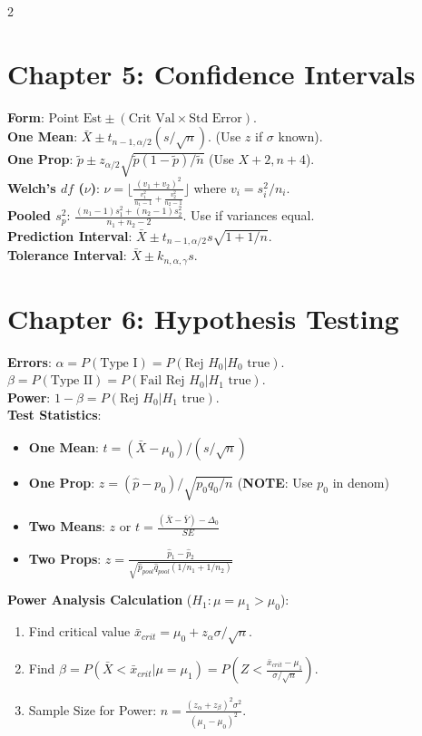 \documentclass[10pt]{article}
\begin{document}
\begin{multicols}{2}
\section*{Chapter 5: Confidence Intervals}
\textbf{Form}: $\text{Point Est} \pm (\text{Crit Val} \times \text{Std Error})$. \\
\textbf{One Mean}: $\bar{X} \pm t_{n-1, \alpha/2} (s/\sqrt{n})$. (Use $z$ if $\sigma$ known). \\
\textbf{One Prop}: $\tilde{p} \pm z_{\alpha/2} \sqrt{\tilde{p}(1-\tilde{p})/\tilde{n}}$ (Use $X+2, n+4$). \\
\textbf{Welch's $df$ ($\nu$)}: $\nu = \lfloor \frac{(v_1+v_2)^2}{\frac{v_1^2}{n_1-1} + \frac{v_2^2}{n_2-1}} \rfloor$ where $v_i = s_i^2/n_i$. \\
\textbf{Pooled $s_p^2$}: $\frac{(n_1-1)s_1^2 + (n_2-1)s_2^2}{n_1+n_2-2}$. Use if variances equal. \\
\textbf{Prediction Interval}: $\bar{X} \pm t_{n-1, \alpha/2} s \sqrt{1 + 1/n}$. \\
\textbf{Tolerance Interval}: $\bar{X} \pm k_{n, \alpha, \gamma} s$.

\columnbreak

\section*{Chapter 6: Hypothesis Testing}
\textbf{Errors}: $\alpha = P(\text{Type I}) = P(\text{Rej } H_0 | H_0 \text{ true})$. \\
$\beta = P(\text{Type II}) = P(\text{Fail Rej } H_0 | H_1 \text{ true})$. \\
\textbf{Power}: $1-\beta = P(\text{Rej } H_0 | H_1 \text{ true})$. \\
\textbf{Test Statistics}:
\begin{itemize}
    \item \textbf{One Mean}: $t = (\bar{X}-\mu_0)/(s/\sqrt{n})$
    \item \textbf{One Prop}: $z = (\hat{p}-p_0)/\sqrt{p_0 q_0/n}$ (\textbf{NOTE}: Use $p_0$ in denom)
    \item \textbf{Two Means}: $z$ or $t = \frac{(\bar{X}-\bar{Y})-\Delta_0}{SE}$
    \item \textbf{Two Props}: $z = \frac{\hat{p}_1-\hat{p}_2}{\sqrt{\hat{p}_{pool}\hat{q}_{pool}(1/n_1+1/n_2)}}$
\end{itemize}

\textbf{Power Analysis Calculation} ($H_1: \mu = \mu_1 > \mu_0$):
\begin{enumerate}
    \item Find critical value $\bar{x}_{crit} = \mu_0 + z_{\alpha}\sigma/\sqrt{n}$.
    \item Find $\beta = P(\bar{X} < \bar{x}_{crit} | \mu = \mu_1) = P(Z < \frac{\bar{x}_{crit}-\mu_1}{\sigma/\sqrt{n}})$.
    \item Sample Size for Power: $n = \frac{(z_\alpha + z_\beta)^2 \sigma^2}{(\mu_1 - \mu_0)^2}$.
\end{enumerate}


\end{multicols}
\end{document}
